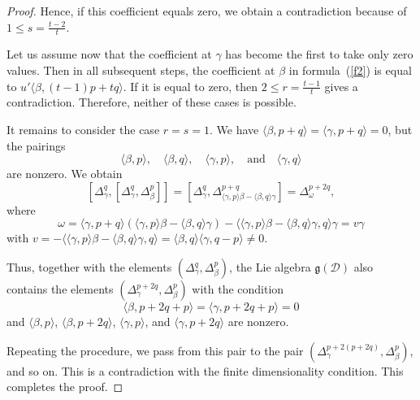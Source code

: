 \documentclass[10pt,a4paper]{amsart}
\begin{document}
\begin{proof}
Hence, if this coefficient equals zero, we obtain a contradiction because of~${1\le s=\frac{t-2}{t}}$. 

Let us assume now that the coefficient at $\gamma$ has become the first to take only zero values. Then in all subsequent steps, the coefficient at $\beta$ in formula~(\ref{f2}) is equal to
$u'\langle\beta,(t-1)p+tq\rangle.$ If it is equal to zero, then $2\le r=\frac{t-1}{t}$ gives a contradiction. Therefore, neither of these cases is possible.

It remains to consider the case $r=s=1$. We have $\langle\beta,p+q\rangle=\langle\gamma,p+q\rangle=0$, but the pairings 
$$
\langle\beta,p\rangle, \quad \langle\beta,q\rangle, \quad \langle\gamma,p\rangle, \quad \text{and} \quad \langle\gamma,q\rangle 
$$
are nonzero. We obtain
$$
[\Delta^q_{\gamma},[\Delta^q_{\gamma}, \Delta^p_{\beta}]]=[\Delta^q_{\gamma},\Delta^{p+q}_{\langle\gamma,p\rangle\beta-\langle\beta,q\rangle\gamma}]= 
\Delta^{p+2q}_{\omega},
$$
where
$$
\omega=\langle\gamma,p+q\rangle(\langle\gamma,p\rangle\beta-\langle\beta,q\rangle\gamma)-\langle\langle\gamma,p\rangle\beta-\langle\beta,q\rangle\gamma,q\rangle\gamma=v\gamma
$$
with $v=-\langle\langle\gamma,p\rangle\beta-\langle\beta,q\rangle\gamma,q\rangle=\langle\beta,q\rangle\langle\gamma,q-p\rangle\ne 0.$ 

Thus, together with the elements $(\Delta^q_{\gamma}, \Delta^p_{\beta})$, the Lie algebra $\mathfrak{g}(\mathcal{D})$ also contains the elements $(\Delta^{p+2q}_{\gamma}, \Delta^p_{\beta})$ with the condition
$$
\langle\beta,p+2q+p\rangle=\langle\gamma,p+2q+p\rangle=0
$$ 
and $\langle\beta,p\rangle$, $\langle\beta,p+2q\rangle$, $\langle\gamma,p\rangle$, and $\langle\gamma,p+2q\rangle$ are nonzero. 

Repeating the procedure, we pass from this pair to the pair $(\Delta^{p+2(p+2q)}_{\gamma}, \Delta^p_{\beta})$, and so on. This is a contradiction with the finite dimensionality condition. This completes the proof.
\end{proof}
\end{document}
